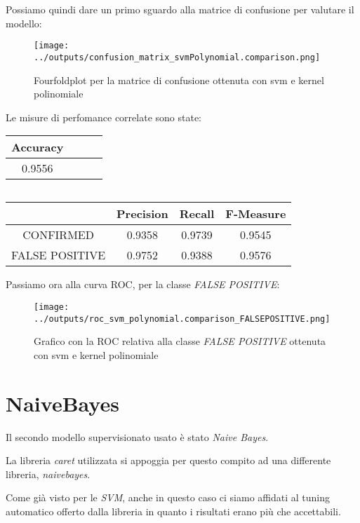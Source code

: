Possiamo quindi dare un primo sguardo alla matrice di confusione per valutare il modello:
\begin{figure}[H]
    \centering
    \texttt{[image: ../outputs/confusion\_matrix\_svmPolynomial.comparison.png]}
    \caption{Fourfoldplot per la matrice di confusione ottenuta con svm e kernel polinomiale}
\end{figure}

Le misure di perfomance correlate sono state:
\begin{center}
    \begin{tabular}{| c | c c c |} 
    \hline
    Accuracy \\ [0.5ex] 
    \hline\hline
    0.9556 \\ 
    \hline
    \end{tabular}
    $\qquad$
    \begin{tabular}{| c | c c c |} 
    \hline  
    & Precision & Recall & F-Measure \\ [0.5ex] 
    \hline\hline
    CONFIRMED & 0.9358 & 0.9739 & 0.9545 \\ 
    \hline
    FALSE POSITIVE  & 0.9752 & 0.9388 & 0.9576 \\ 
    \hline
    \end{tabular}
\end{center}

Passiamo ora alla curva ROC, per la classe \textit{FALSE POSITIVE}:
\begin{figure}[H]
    \centering
    \texttt{[image: ../outputs/roc\_svm\_polynomial.comparison\_FALSEPOSITIVE.png]}
    \caption{Grafico con la ROC relativa alla classe \textit{FALSE POSITIVE} ottenuta con 
    svm e kernel polinomiale}
\end{figure}

\section{NaiveBayes}
Il secondo modello supervisionato usato è stato \textit{Naive Bayes}.

La libreria \textit{caret} utilizzata si appoggia per questo compito ad una 
differente libreria, \textit{naivebayes}.

Come già visto per le \textit{SVM}, anche in questo caso ci siamo affidati al tuning 
automatico offerto dalla libreria in quanto i risultati erano più che 
accettabili.


